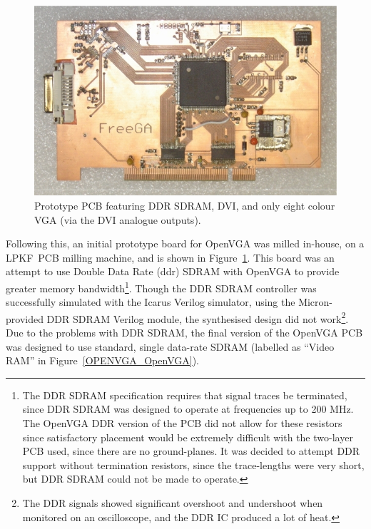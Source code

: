 \begin{figure}[h]
\begin{center}
\includegraphics[width=\linewidth]{images/FreeGA_orig.jpeg}
\caption[OpenVGA PCB version 2 with DDR SDRAM]{Prototype PCB featuring DDR
SDRAM, DVI, and only eight colour VGA (via the DVI analogue outputs).}
\label{OPENVGA_Version2}
\end{center}
\end{figure}

Following this, an initial prototype board for OpenVGA was milled in-house, on a
LPKF\texttrademark~PCB milling machine, and is shown in
Figure~\ref{OPENVGA_Version2}. This board was an attempt to use Double Data
Rate (\gls{ddr}) SDRAM with
OpenVGA to provide greater memory bandwidth\footnote{The DDR SDRAM specification
requires that signal traces be terminated, since DDR SDRAM was designed to
operate at frequencies up to 200 MHz. The OpenVGA DDR version of the PCB did not
allow for these resistors since satisfactory placement would be extremely
difficult with the two-layer PCB used, since there are no ground-planes. It was
decided to attempt DDR support without termination resistors, since the
trace-lengths were very short, but DDR SDRAM could not be made to operate.}.
Though the DDR SDRAM controller was successfully simulated with the Icarus
Verilog simulator, using the Micron-provided DDR SDRAM Verilog module, the
synthesised design did not work\footnote{The DDR signals showed significant
overshoot and undershoot when monitored on an oscilloscope, and the DDR IC
produced a lot of heat.}. Due to the problems with DDR SDRAM, the final version
of the OpenVGA PCB was designed to use standard, single data-rate SDRAM (labelled
as ``Video RAM'' in Figure~\ref{OPENVGA_OpenVGA}).


